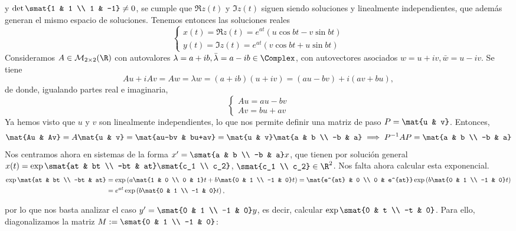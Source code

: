\documentclass[../ecuaciones_diferenciales.tex]{subfiles}
\begin{document}
  y \(\det\smat{1 & 1 \\ 1 & -1} \neq 0\), se cumple que \(\Re z(t)\) y
  \(\Im z(t)\) siguen siendo soluciones y linealmente independientes, que además
  generan el mismo espacio de soluciones. Tenemos entonces las soluciones reales
  \[
    \begin{cases}
      x(t) = \Re z(t) = e^{at}(u\cos bt - v\sin bt) \\
      y(t) = \Im z(t) = e^{at}(v\cos bt + u\sin bt)
    \end{cases}
  \]
  Consideramos \(A \in \mathcal{M}_{2 \times 2}(\R)\) con autovalores
  \(\lambda = a+ib, \bar{\lambda} = a-ib \in \Complex\), con autovectores
  asociados \(w = u+iv, \bar{w} = u-iv\). Se tiene
  \[Au + iAv = Aw = \lambda w = (a+ib)(u+iv) = (au-bv) + i(av+bu),\]
  de donde, igualando partes real e imaginaria,
  \[
  \begin{cases}
    Au = au-bv \\
    Av = bu+av
  \end{cases}
  \]
  Ya hemos visto que \(u\) y \(v\) son linealmente independientes, lo que nos
  permite definir una matriz de paso \(P = \mat{u & v}\). Entonces,
  \[\mat{Au & Av} = A \mat{u & v} = \mat{au-bv & bu+av} = \mat{u & v} \mat{a & b
      \\ -b & a} \implies P^{-1}AP = \mat{a & b \\ -b & a}\]
  Nos centramos ahora en sistemas de la forma \(x' = \smat{a & b \\ -b & a}x\),
  que tienen por solución general \(x(t) = \exp \smat{at & bt \\ -bt & at}
  \smat{c_1 \\ c_2}\), \(\smat{c_1 \\ c_2} \in \R^2\). Nos falta ahora calcular
  esta exponencial.
  \begin{align*}
    \exp\mat{at & bt \\ -bt & at} &= \exp\left(a\mat{1 & 0 \\ 0 & 1}t + b\mat{0 & 1 \\
    -1 & 0}t\right) = \mat{e^{at} & 0 \\ 0 & e^{at}} \exp\left(b\mat{0 & 1
    \\ -1 & 0}t\right) \\
    &= e^{at}\exp\left(b\mat{0 & 1 \\ -1 & 0}t\right),
  \end{align*}

  por lo que nos basta analizar el caso \(y' = \smat{0 & 1 \\ -1 & 0}y\), es
  decir, calcular \(\exp \smat{0 & t \\ -t & 0}\). Para ello, diagonalizamos la
  matriz \(M := \smat{0 & 1 \\ -1 & 0}\):
\end{document}
